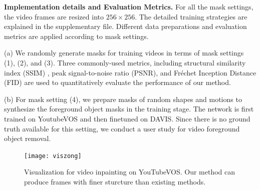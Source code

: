 \noindent \textbf{Implementation details and Evaluation Metrics.} 
For all the mask settings, the video frames are resized into $256\times256$. The detailed training strategies are explained in the supplementary file. 
Different data preparations and evaluation metrics are applied according to mask settings.

\noindent (a) We randomly generate masks for training videos in terms of mask settings (1), (2), and (3).  
 Three commonly-used metrics, including structural similarity index (SSIM) \cite{wang2004image}, peak signal-to-noise ratio (PSNR), and Fr{\'e}chet Inception Distance (FID) \cite{heusel2017gans} are used to quantitatively evaluate the performance of our method. 

\noindent (b) For mask setting (4), we prepare masks of random shapes and motions to synthesize the foreground object masks in the training stage. The network is first trained on YoutubeVOS and then finetuned on DAVIS. Since there is no ground truth available for this setting, we conduct a user study for video foreground object removal.  

%
%
%
%






  

%
% 



\begin{figure}[t]
	\centering
	\texttt{[image: viszong]} %
	\caption{Visualization for video inpainting on YouTubeVOS. Our method can produce frames with finer sturcture than existing methods. }
	\label{viszong}
\end{figure}



